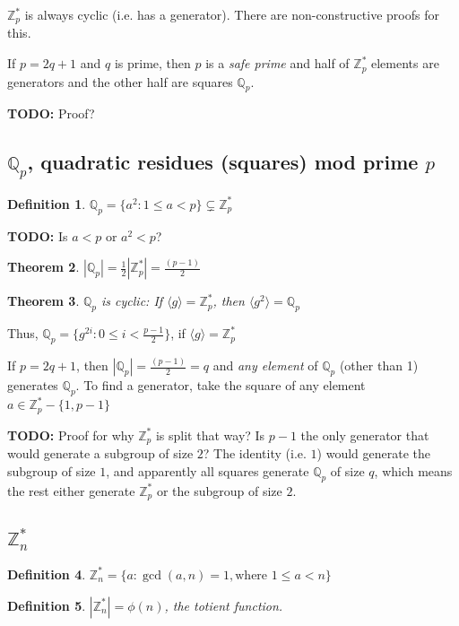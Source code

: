 \documentclass[12pt]{article}
\newtheorem{thm}{Theorem}[section]
\newtheorem{definition}[thm]{Definition}
\newcommand{\Zp}{\mathbb{Z}^{\ast}_p}
\newcommand{\Zn}{\mathbb{Z}^{\ast}_n}
\newcommand{\Qp}{\mathbb{Q}_p}
\newcommand{\gen}[1]{\langle #1 \rangle}
\newcommand{\todo}{\textbf{TODO:} }
\newcommand{\sz}[1]{\left|#1\right|}
\begin{document}
$\Zp$ is always cyclic (i.e. has a generator). There are non-constructive proofs
for this.

If $p = 2q + 1$ and $q$ is prime, then $p$ is a \emph{safe prime} and half of
$\Zp$ elements are generators and the other half are squares $\Qp$.

\todo Proof?

\subsection{$\Qp$, quadratic residues (squares) mod prime $p$}
\begin{definition}
$\Qp = \{a^2 : 1 \le a < p\} \subsetneq \Zp$
\end{definition}

\todo Is $a < p$ or $a^2 < p$?

\begin{thm}
$|\Qp| = \frac{1}{2}\sz{\Zp} = \frac{(p-1)}{2}$
\end{thm}

\begin{thm}
$\Qp$ is cyclic: If $\gen{g} = \Zp$, then $\gen{g^2} = \Qp$
\end{thm}

Thus, $\Qp = \{g^{2i} : 0 \le i < \frac{p-1}{2}\}$, if $\gen{g} = \Zp$

If $p = 2q + 1$, then $\sz{\Qp} = \frac{(p-1)}{2} = q$ and \emph{any element} of
$\Qp$ (other than 1) generates $\Qp$. To find a generator, take the square of
any element $a \in \Zp - \{1, p-1\}$

\todo Proof for why $\Zp$ is split that way? Is $p-1$ the only generator
that would generate a subgroup of size $2$? The identity (i.e. $1$) would generate
the subgroup of size $1$, and apparently all squares generate $\Qp$ of size $q$,
which means the rest either generate $\Zp$ or the subgroup of size $2$.

\subsection{$\Zn$}

\begin{definition}
$\Zn = \{a : \gcd(a, n) = 1, \text{where } 1 \le a < n\}$
\end{definition}

\begin{definition}
$\sz{\Zn} = \phi(n)$, the \emph{totient} function.
\end{definition}
\end{document}
